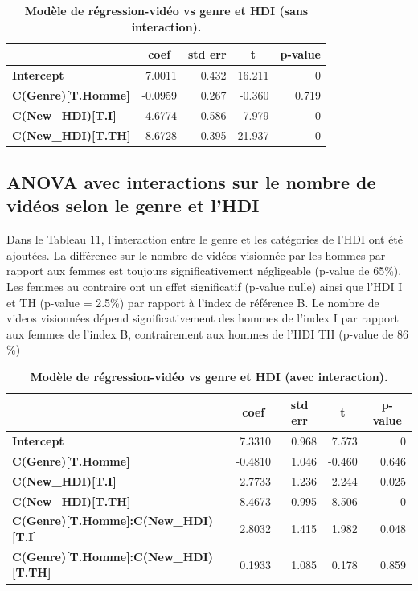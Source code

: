 \documentclass[12pt, a4paper, titlepage, table]{article}
\begin{document}
	\begin{table}[H]
		\centering
		\fontsize{12}{20}\selectfont
		\begin{tabular}{|l|r|r|r|r|}
			\hline
			\multicolumn{1}{|c|}{\textbf{}}&
			\multicolumn{1}{c|}{\textbf{coef}}&
			\multicolumn{1}{c|}{\textbf{std err}}&
			\multicolumn{1}{c|}{\textbf{t}}&
			\multicolumn{1}{c|}{\textbf{p-value}}\\	
			\hline
			\textbf{Intercept}&			7.0011&		0.432&	16.211&	0\\	
			\textbf{C(Genre)[T.Homme]}&	-0.0959&	0.267&	-0.360&	0.719\\
			\textbf{C(New\_HDI)[T.I]}&	4.6774&		0.586&	7.979&	0\\
			\textbf{C(New\_HDI)[T.TH]}&	8.6728&		0.395&	21.937&	0\\
			\hline
		\end{tabular}
		\caption{\textbf{Modèle de régression-vidéo vs genre et HDI (sans interaction).}}
	\end{table}	

	\subsection{ANOVA avec interactions sur le nombre de vidéos selon le genre et l'HDI}	
	Dans le Tableau 11, l'interaction entre le genre et les catégories de l'HDI ont été ajoutées. La différence sur le nombre de vidéos visionnée par les hommes  par rapport aux femmes est toujours significativement négligeable (p-value de 65\%). Les femmes au contraire ont un effet significatif (p-value nulle) ainsi que l'HDI I et TH (p-value = 2.5\%) par rapport à l'index de référence B. Le nombre de videos visionnées dépend significativement des hommes de l'index I par rapport aux femmes de l'index B, contrairement aux hommes de l'HDI TH (p-value de 86 \%)  
	
	\begin{table}[H]
		\centering
		\fontsize{12}{20}\selectfont
		\begin{tabular}{|l|r|r|r|r|}
			\hline
			\multicolumn{1}{|c|}{\textbf{}}&
			\multicolumn{1}{c|}{\textbf{coef}}&
			\multicolumn{1}{c|}{\textbf{std err}}&
			\multicolumn{1}{c|}{\textbf{t}}&
			\multicolumn{1}{c|}{\textbf{p-value}}\\	
			\hline
				\textbf{Intercept}&			7.3310&			0.968&	7.573&	0\\
				\textbf{C(Genre)[T.Homme]}&	-0.4810&		1.046&	-0.460&	0.646\\	
				\textbf{C(New\_HDI)[T.I]}&	2.7733&			1.236&	2.244&	0.025\\	
				\textbf{C(New\_HDI)[T.TH]}&	8.4673&			0.995&	8.506&	0\\	
				\textbf{C(Genre)[T.Homme]:C(New\_HDI)[T.I]}&	2.8032&	1.415&	1.982&	0.048\\
				\textbf{C(Genre)[T.Homme]:C(New\_HDI)[T.TH]}&	0.1933&	1.085&	0.178&	0.859\\
			\hline
		\end{tabular}
	\caption{\textbf{Modèle de régression-vidéo vs genre et HDI (avec interaction).}}
\end{table}
	
\end{document}
